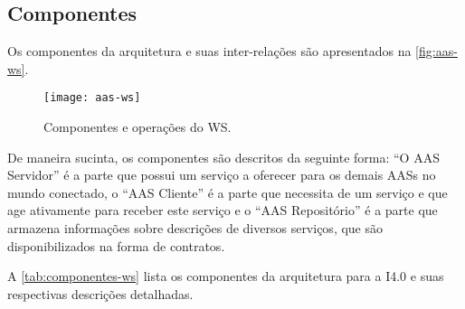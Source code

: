 \subsection{Componentes}

Os componentes da arquitetura e suas inter-relações são apresentados na \autoref{fig:aas-ws}.

\begin{figure}[htb]
	\centering
	\texttt{[image: aas-ws]}
	\caption{Componentes e operações do WS.}
	\label{fig:aas-ws}
\end{figure}

De maneira sucinta, os componentes são descritos da seguinte forma: ``O AAS Servidor'' é a parte que possui um serviço a oferecer para os demais AASs no mundo conectado, o ``AAS Cliente'' é a parte que necessita de um serviço e que age ativamente para receber este serviço e o ``AAS Repositório'' é a parte que armazena informações sobre descrições de diversos serviços, que são disponibilizados na forma de contratos.

A \autoref{tab:componentes-ws} lista os componentes da arquitetura para a I4.0 e suas respectivas descrições detalhadas.

